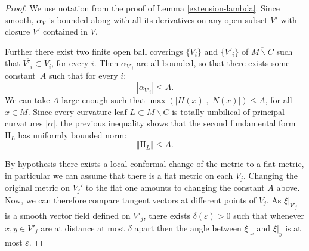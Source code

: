 \documentclass[10pt]{amsart}
\let\moins\smallsetminus
\newcommand{\II}{\mathrm{II}}
\let\parallel\Vert
\theoremstyle{definition}
\theoremstyle{remark}
\numberwithin{equation}{section}
\begin{document}
\begin{proof}
We use notation from the proof of Lemma \ref{extension-lambda}.
Since smooth, $\alpha_V$ is bounded along with all its derivatives on any open subset $V'$ with closure $\overline{V'}$ contained in $V$.

Further there exist two finite open ball coverings $\{V_i\}$ and $\{V'_i\}$ of $\overline{M\moins C}$ such that
$\overline{V'_i}\subset V_i$, for every $i$. Then $\alpha_{V'_i}$ are all bounded, so that there exists some
constant~$A$ such that for every $i$:
\[ |\alpha_{V'_i}| \leq A.\]
We can take $A$ large enough such that $\max(|H(x)|, |N(x)|) \leq A$, for all $x\in M$.
Since every curvature leaf $L\subset M\moins C$ is totally umbilical of principal curvatures $|\alpha|$, the previous inequality shows that
the second fundamental form $\II_{L}$ has uniformly bounded norm:
\[ \parallel \II_{L} \parallel \leq A.\]

By hypothesis there exists a local conformal change of the metric to a flat metric, in particular we can assume that
there is a flat metric on each $V_j$. Changing the original metric on $V_j'$ to the flat one amounts
to changing the constant $A$ above. Now, we can therefore compare tangent vectors at different points of $V_j$.
As $\xi|_{V'_j}$ is a smooth vector field defined on $V'_j$, there exists $\delta(\varepsilon)>0$ such that
whenever $x,y\in V'_j$ are at distance at most $\delta$ apart then the angle between
$\xi|_x$ and $\xi|_y$ is at most $\varepsilon$.


\end{proof}
\end{document}
